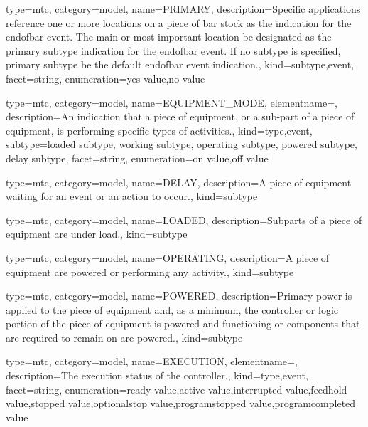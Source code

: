 {
  type=mtc,
  category=model,
  name={PRIMARY},
  description={Specific applications \MAY reference one or more locations on a piece of bar stock as the indication for the \gls{endofbar event}. The main or most important location \must be designated as the \gls{primary subtype} indication for the \gls{endofbar event}.   \newline If no \gls{subtype} is specified, \gls{primary subtype} \must be the default \gls{endofbar event} indication.},
  kind={subtype,event},
  facet={\gls{string}},
  enumeration={\gls{yes value},\gls{no value}}
}


{
  type=mtc,
  category=model,
  name={EQUIPMENT\_MODE},
  elementname=,
  description={An indication that a piece of equipment, or a sub-part of a piece of equipment, is performing specific types of activities.},
  kind={type,event},
  subtype={\gls{loaded subtype}, \gls{working subtype}, \gls{operating subtype}, \gls{powered subtype}, \gls{delay subtype}},
  facet={\gls{string}},
  enumeration={\gls{on value},\gls{off value}}
}


{
  type=mtc,
  category=model,
  name={DELAY},
  description={A piece of equipment waiting for an event or an action to occur.},
  kind={subtype}
}


{
  type=mtc,
  category=model,
  name={LOADED},
  description={Subparts of a piece of equipment are under load.},
  kind={subtype}
}


{
  type=mtc,
  category=model,
  name={OPERATING},
  description={A piece of equipment are powered or performing any activity.},
  kind={subtype}
}


{
  type=mtc,
  category=model,
  name={POWERED},
  description={Primary  power is  applied  to the  piece  of  equipment and,  as  a minimum, the controller or logic portion of the piece of equipment is powered and functioning or components that are required to remain on are powered.},
  kind={subtype}
}



{
  type=mtc,
  category=model,
  name={EXECUTION},
  elementname=,
  description={The execution status of the \gls{controller}.},
  kind={type,event},
  facet={\gls{string}},
  enumeration={\gls{ready value},\gls{active value},\gls{interrupted value},\gls{feedhold value},\gls{stopped value},\gls{optionalstop value},\gls{programstopped value},\gls{programcompleted value}}
}


